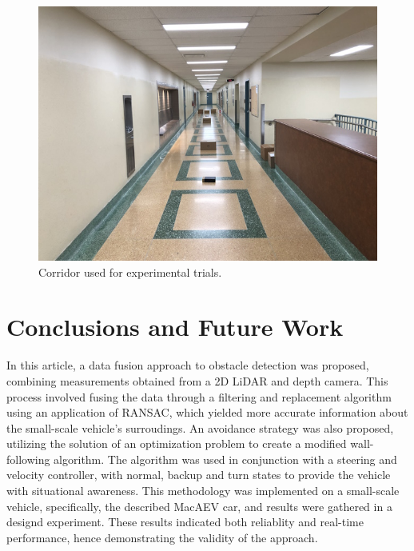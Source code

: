 \documentclass[conference]{IEEEtran}
\begin{document}
\begin{figure}
    \centering
    \includegraphics[scale=0.3]{IMG_0506.jpg}
    \caption{Corridor used for experimental trials.}
    \label{Figure 8}
\end{figure}



\section{Conclusions and Future Work}
In this article, a data fusion approach to obstacle detection was proposed, combining measurements obtained from a 2D LiDAR and depth camera. This process involved fusing the data through a filtering and replacement algorithm using an application of RANSAC, which yielded more accurate information about the small-scale vehicle's surroudings. An avoidance strategy was also proposed, utilizing the solution of an optimization problem to create a modified wall-following algorithm. The algorithm was used in conjunction with  a steering and velocity controller, with normal, backup and turn states to provide the vehicle with situational awareness. This methodology was implemented on a small-scale vehicle, specifically, the described MacAEV car, and results were gathered in a designd experiment. These results indicated both reliablity and real-time performance, hence demonstrating the validity of the approach. 



\end{document}
